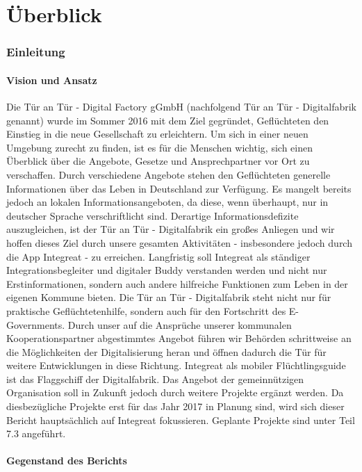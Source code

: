 \documentclass[12pt, a4paper]{article} %
\begin{document}
\newpage
\part{Überblick}
\section{Einleitung}
\subsection{Vision und Ansatz}

Die Tür an Tür - Digital Factory gGmbH (nachfolgend Tür an Tür - Digitalfabrik genannt) wurde im Sommer 2016 mit dem Ziel gegründet, Geflüchteten den Einstieg in die neue Gesellschaft zu erleichtern. Um sich in einer neuen Umgebung zurecht zu finden, ist es für die Menschen wichtig, sich einen Überblick über die Angebote, Gesetze und Ansprechpartner vor Ort zu verschaffen. Durch verschiedene Angebote stehen den Geflüchteten generelle Informationen über das Leben in Deutschland zur Verfügung. Es mangelt bereits jedoch an lokalen Informationsangeboten, da diese, wenn überhaupt, nur in deutscher Sprache verschriftlicht sind. Derartige Informationsdefizite auszugleichen, ist der Tür an Tür - Digitalfabrik ein großes Anliegen und wir hoffen dieses Ziel durch unsere gesamten Aktivitäten -  insbesondere jedoch durch die App Integreat -  zu erreichen. Langfristig soll Integreat als ständiger Integrationsbegleiter und digitaler Buddy verstanden werden und nicht nur Erstinformationen, sondern auch andere hilfreiche Funktionen zum Leben in der eigenen Kommune bieten. 
Die Tür an Tür - Digitalfabrik steht nicht nur für praktische Geflüchtetenhilfe, sondern auch für den Fortschritt des E-Governments. Durch unser auf die Ansprüche unserer kommunalen Kooperationspartner abgestimmtes Angebot führen wir Behörden schrittweise an die Möglichkeiten der Digitalisierung heran und öffnen dadurch die Tür für weitere Entwicklungen in diese Richtung. 
Integreat als mobiler Flüchtlingsguide ist das Flaggschiff der Digitalfabrik. Das Angebot der gemeinnützigen Organisation soll in Zukunft jedoch durch weitere Projekte ergänzt werden. Da diesbezügliche Projekte erst für das Jahr 2017 in Planung sind, wird sich dieser Bericht hauptsächlich auf Integreat fokussieren. Geplante Projekte sind unter Teil 7.3 angeführt.

\newpage
\subsection{Gegenstand des Berichts}
\end{document}
